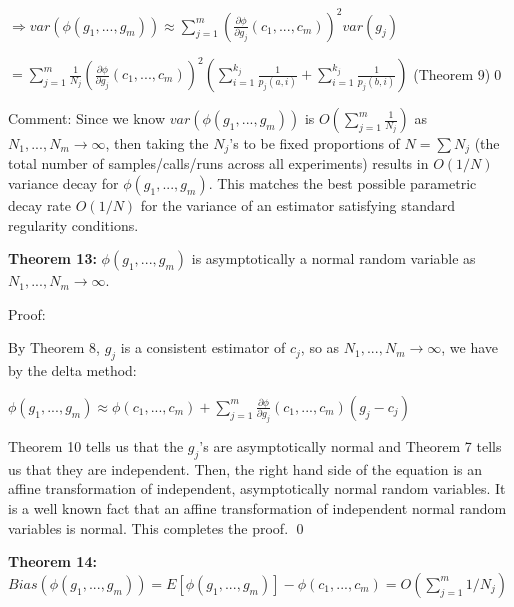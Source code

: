 \documentclass{article}
\begin{document}
$\displaystyle \Longrightarrow var\left( \phi \left( g_{1} ,...,g_{m}\right)\right) \approx \sum _{j=1}^{m}\left(\frac{\partial \phi }{\partial g_{j}}\left( c_{1} ,...,c_{m}\right)\right)^{2} var\left( g_{j}\right)$

$\displaystyle =\sum _{j=1}^{m}\frac{1}{N_{j}}\left(\frac{\partial \phi }{\partial g_{j}}\left( c_{1} ,...,c_{m}\right)\right)^{2}\left(\sum _{i=1}^{k_{j}}\frac{1}{p_{j}\left( a,i\right)} +\sum _{i=1}^{k_{j}}\frac{1}{p_{j}\left( b,i\right)}\right)$ (Theorem 9)\qed 



Comment: Since we know $\displaystyle var\left( \phi \left( g_{1} ,...,g_{m}\right)\right)$ is $\displaystyle O\left(\sum _{j=1}^{m}\frac{1}{N_{j}}\right)$ as $\displaystyle N_{1} ,...,N_{m}\rightarrow \infty $, then taking the $\displaystyle N_{j}$'s to be fixed proportions of $\displaystyle N=\sum N_{j}$ (the total number of samples/calls/runs across all experiments) results in $\displaystyle O\left( 1/N\right)$ variance decay for $\displaystyle \phi \left( g_{1} ,...,g_{m}\right)$. This matches the best possible parametric decay rate $\displaystyle O\left( 1/N\right)$ for the variance of an estimator satisfying standard regularity conditions.



\textbf{Theorem 13:} $\displaystyle \phi \left( g_{1} ,...,g_{m}\right)$ is asymptotically a normal random variable as $\displaystyle N_{1} ,...,N_{m}\rightarrow \infty $.



Proof: 

By Theorem 8, $\displaystyle g_{j}$ is a consistent estimator of $\displaystyle c_{j}$, so as $\displaystyle N_{1} ,...,N_{m}\rightarrow \infty $, we have by the delta method:

$\displaystyle \phi \left( g_{1} ,...,g_{m}\right) \approx \phi \left( c_{1} ,...,c_{m}\right) +\sum _{j=1}^{m}\frac{\partial \phi }{\partial g_{j}}\left( c_{1} ,...,c_{m}\right)\left( g_{j} -c_{j}\right)$ 

Theorem 10 tells us that the $\displaystyle g_{j}$'s are asymptotically normal and Theorem 7 tells us that they are independent. Then, the right hand side of the equation is an affine transformation of independent, asymptotically normal random variables. It is a well known fact that an affine transformation of independent normal random variables is normal. This completes the proof. \qed 



\textbf{Theorem 14: }$\displaystyle Bias\left( \phi \left( g_{1} ,...,g_{m}\right)\right) =E\left[ \phi \left( g_{1} ,...,g_{m}\right)\right] -\phi \left( c_{1} ,...,c_{m}\right) =O\left(\sum _{j=1}^{m} 1/N_{j}\right)$
\end{document}
